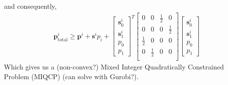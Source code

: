 \documentclass{article}
\begin{document}
and consequently,
\begin{align}
	\mathbf{p}_{\text{total}}^i \ge \mathbf{p}^i + \mathbf{s}^ip_i + \begin{bmatrix}\mathbf{s}_0^i \\ \mathbf{s}_1^i \\ p_0 \\ p_1 \end{bmatrix}^T
		\begin{bmatrix}0 & 0 & \frac{1}{2} & 0\\
			0 & 0 & 0 & \frac{1}{2}\\
			       \frac{1}{2} & 0 & 0 & 0\\ 
			       0 & \frac{1}{2} & 0 & 0\\ 
		\end{bmatrix}
\begin{bmatrix}\mathbf{s}_0^i \\ \mathbf{s}_1^i \\ p_0 \\ p_1 \end{bmatrix}
\end{align}
Which gives us a (non-convex?) Mixed Integer Quadratically Constrained Problem (MIQCP) (can solve with Gurobi?).
\end{document}
